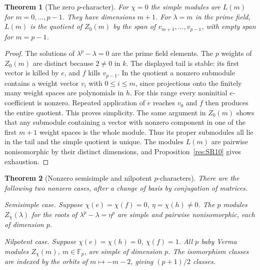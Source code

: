 \documentclass[11pt,oneside,openany]{book}
\newtheorem{theorem}{Theorem}[chapter]
\theoremstyle{definition}
\theoremstyle{remark}
\begin{document}
\begin{theorem}[The zero \(p\)-character]
\label{res:SR11}
For \(\chi=0\) the simple modules are \(L(m)\) for
\(m=0,\ldots,p-1\). They have dimensions \(m+1\).
For \(\lambda=m\) in the prime field, \(L(m)\) is the
quotient of \(Z_0(m)\) by the span of
\(v_{m+1},\ldots,v_{p-1}\), with empty span for \(m=p-1\).
\end{theorem}

\begin{proof}
The solutions of \(\lambda^p-\lambda=0\) are the prime
field elements. The \(p\) weights of \(Z_0(m)\) are
distinct because \(2\ne0\) in \(k\). The displayed tail
is stable: its first vector is killed by \(e\), and \(f\)
kills \(v_{p-1}\). In the quotient a nonzero submodule
contains a weight vector \(v_i\) with \(0\le i\le m\),
since projections onto the finitely many weight spaces
are polynomials in \(h\). For this range every noninitial
\(e\)-coefficient is nonzero. Repeated application of \(e\)
reaches \(v_0\) and \(f\) then produces the entire quotient.
This proves simplicity. The same argument in \(Z_0(m)\)
shows that any submodule containing a vector with nonzero
component in one of the first \(m+1\) weight spaces is
the whole module. Thus its proper submodules all lie in
the tail and the simple quotient is unique.
The modules \(L(m)\) are pairwise nonisomorphic by their
distinct dimensions, and Proposition~\ref{res:SR10}
gives exhaustion.
\end{proof}

\begin{theorem}[Nonzero semisimple and nilpotent \(p\)-characters]
\label{res:SR12}
There are the following two nonzero cases, after a change
of basis by conjugation of matrices.

\emph{Semisimple case.} Suppose
\(\chi(e)=\chi(f)=0\), \(\eta=\chi(h)\ne0\).
The \(p\) modules \(Z_\chi(\lambda)\) for the roots of
\(\lambda^p-\lambda=\eta^p\) are simple and pairwise
nonisomorphic, each of dimension \(p\).

\emph{Nilpotent case.} Suppose
\(\chi(e)=\chi(h)=0\), \(\chi(f)=1\).
All \(p\) baby Verma modules \(Z_\chi(m)\), \(m\in\mathbb F_p\),
are simple of dimension \(p\). The isomorphism classes
are indexed by the orbits of \(m\mapsto -m-2\), giving
\((p+1)/2\) classes.
\end{theorem}
\end{document}
